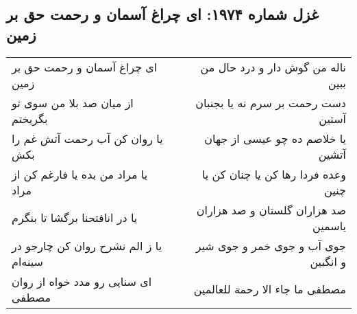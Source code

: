 \begin{center}
\section*{غزل شماره ۱۹۷۴: ای چراغ آسمان و رحمت حق بر زمین}
\label{sec:1974}
\begin{longtable}{l p{0.5cm} r}
ای چراغ آسمان و رحمت حق بر زمین
&&
ناله من گوش دار و درد حال من ببین
\\
از میان صد بلا من سوی تو بگریختم
&&
دست رحمت بر سرم نه یا بجنبان آستین
\\
یا روان کن آب رحمت آتش غم را بکش
&&
یا خلاصم ده چو عیسی از جهان آتشین
\\
یا مراد من بده یا فارغم کن از مراد
&&
وعده فردا رها کن یا چنان کن یا چنین
\\
یا در انافتحنا برگشا تا بنگرم
&&
صد هزاران گلستان و صد هزاران یاسمین
\\
یا ز الم نشرح روان کن چارجو در سینه‌ام
&&
جوی آب و جوی خمر و جوی شیر و انگبین
\\
ای سنایی رو مدد خواه از روان مصطفی
&&
مصطفی ما جاء الا رحمة للعالمین
\\
\end{longtable}
\end{center}
